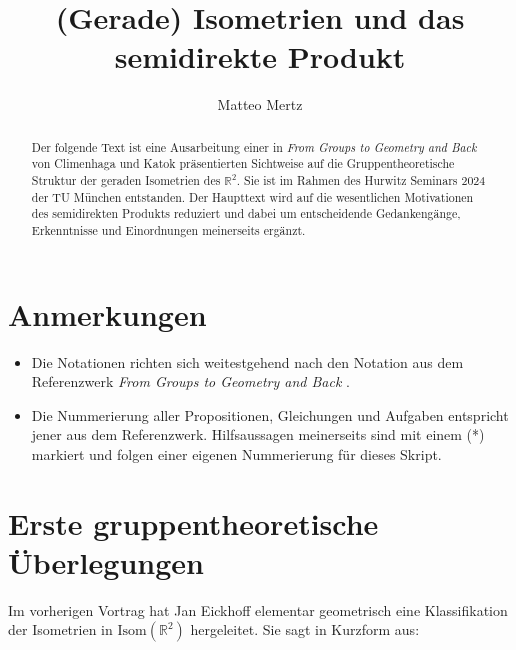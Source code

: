 \documentclass[a4paper, ngerman]{article}
\title{(Gerade) Isometrien und das semidirekte Produkt}
\author{Matteo Mertz}
\numberwithin{equation}{chapter}
\theoremstyle{plain}
\theoremstyle{definition}
\newcommand{\anm}[1]{{\color{red} #1}}
\begin{document}
\setcounter{proposition}{7}

\maketitle

\begin{abstract}
    Der folgende Text ist eine Ausarbeitung einer in \textit{From Groups to Geometry and Back} von Climenhaga und Katok \cite{referenzwerk} präsentierten Sichtweise auf die Gruppentheoretische Struktur der geraden Isometrien des \(\mathbb R^2\). Sie ist im Rahmen des Hurwitz Seminars 2024 der TU München entstanden. Der Haupttext wird auf die wesentlichen Motivationen des semidirekten Produkts reduziert und dabei um entscheidende Gedankengänge, Erkenntnisse und Einordnungen meinerseits ergänzt.  
\end{abstract}

\section*{Anmerkungen}
\begin{itemize}
    \item Die Notationen richten sich weitestgehend nach den Notation aus dem Referenzwerk \textit{From Groups to Geometry and Back} \cite{referenzwerk}. 
    \item Die Nummerierung aller Propositionen, Gleichungen und Aufgaben entspricht jener aus dem Referenzwerk. Hilfsaussagen meinerseits sind mit einem (*) markiert und folgen einer eigenen Nummerierung für dieses Skript. 
\end{itemize}

\section{Erste gruppentheoretische Überlegungen}\label{sec:wiederholung}
Im vorherigen Vortrag %
hat Jan Eickhoff elementar geometrisch eine Klassifikation der Isometrien in \(\mathrm{Isom}(\mathbb R^2)\) hergeleitet. Sie sagt in Kurzform aus: 
\end{document}
